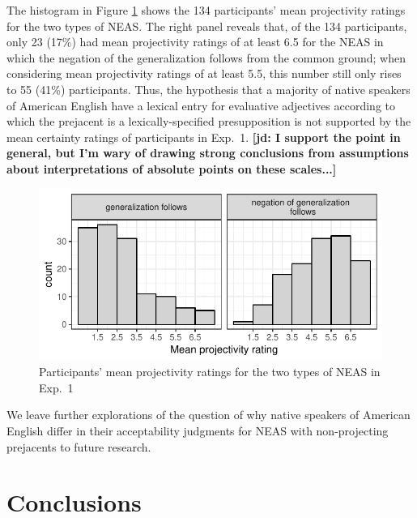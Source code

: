 \documentclass[11pt,fleqn]{article}
\newcommand{\6}{\mbox{$[\hspace*{-.6mm}[$}}
\newcommand{\9}{\mbox{$]\hspace*{-.6mm}]$}}
\newcommand{\jd}[1]{\textbf{\color{green}[jd: #1]}}
\begin{document}
The histogram in Figure \ref{f-dialect} shows the 134 participants' mean projectivity ratings for the two types of NEAS. The right panel reveals that, of the 134 participants, only 23 (17\%) had mean projectivity ratings of at least 6.5 for the NEAS in which the negation of the generalization follows from the common ground; when considering mean projectivity ratings of at least 5.5, this number still only rises to 55 (41\%) participants. Thus, the hypothesis that a majority of native speakers of American English have a lexical entry for evaluative adjectives according to which the prejacent is a lexically-specified presupposition is not supported by the mean certainty ratings of participants in Exp.~1. \jd{I support the point in general, but I'm wary of drawing strong conclusions from assumptions about interpretations of absolute points on these scales...}


\begin{figure}[h!]
\begin{center}
\includegraphics[scale=.9]{../exp1/graphs/count-of-participants}

\caption{Participants' mean projectivity ratings for the two types of NEAS in Exp.~1}\label{f-dialect}
\end{center}
\end{figure}

We leave further explorations of the question of why native speakers of American English differ in their acceptability judgments for NEAS with non-projecting prejacents to future research.

\section{Conclusions}\label{s6}
\end{document}
